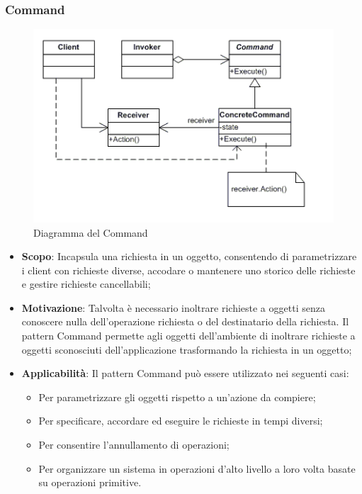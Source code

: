 		\subsubsection{Command}
		\begin{figure}[H]
		\centering
		\includegraphics[width=0.6\linewidth]{GraficiAppendici/command.png}
		\caption{Diagramma del  Command}
	\end{figure}
		\begin{itemize}
		\item \textbf{Scopo}: Incapsula una richiesta in un oggetto, consentendo di parametrizzare i
client con richieste diverse, accodare o mantenere uno storico delle richieste e gestire richieste cancellabili;
		\item \textbf{Motivazione}: Talvolta è necessario inoltrare richieste a oggetti senza conoscere
nulla dell’operazione richiesta o del destinatario della richiesta. Il pattern Command permette agli oggetti dell’ambiente di inoltrare richieste a oggetti sconosciuti dell’applicazione trasformando la richiesta in un oggetto;
		\item \textbf{Applicabilità}: Il pattern Command può essere utilizzato nei seguenti casi:
		\begin{itemize}
		\item Per parametrizzare gli oggetti rispetto a un’azione da compiere;
		\item Per specificare, accordare ed eseguire le richieste in tempi diversi;
		\item Per consentire l’annullamento di operazioni;
		\item Per organizzare un sistema in operazioni d’alto livello a loro volta basate su operazioni primitive.
		\end{itemize}

		\end{itemize}
